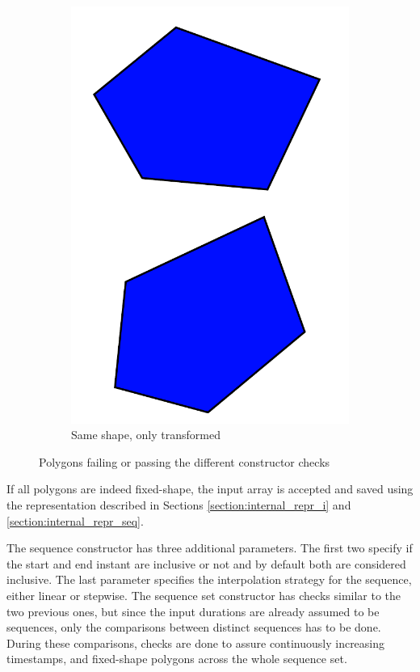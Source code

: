 \begin{figure}[h!]
\begin{subfigure}{.3\textwidth}
        \includegraphics[width=\textwidth]{images/pass_all_tests.pdf}
        \caption{Same shape, only transformed}
    \end{subfigure}
    \caption{Polygons failing or passing the different constructor checks}
    \label{fig:constr_checks}
\end{figure}

If all polygons are indeed fixed-shape, the input array is accepted and saved using the representation described in Sections \ref{section:internal_repr_i} and \ref{section:internal_repr_seq}.

The sequence constructor has three additional parameters. The first two specify if the start and end instant are inclusive or not and by default both are considered inclusive. The last parameter specifies the interpolation strategy for the sequence, either linear or stepwise. The sequence set constructor has checks similar to the two previous ones, but since the input durations are already assumed to be sequences, only the comparisons between distinct sequences has to be done. During these comparisons, checks are done to assure continuously increasing timestamps, and fixed-shape polygons across the whole sequence set.


